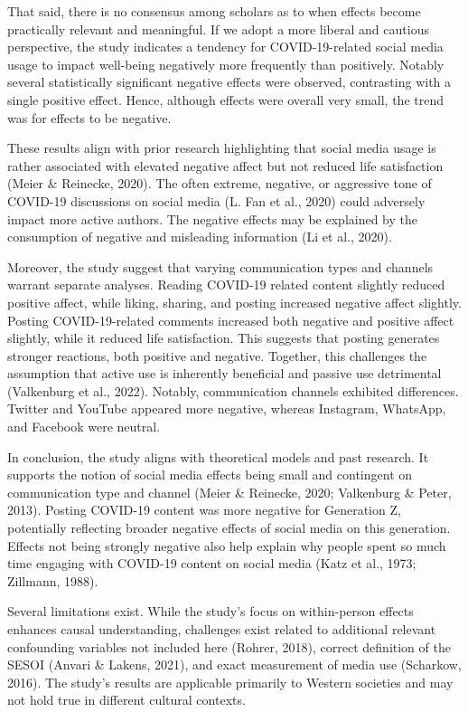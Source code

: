 \documentclass[
  man,mask,floatsintext]{apa7}
\begin{document}
That said, there is no consensus among scholars as to when effects become practically relevant and meaningful. If we adopt a more liberal and cautious perspective, the study indicates a tendency for COVID-19-related social media usage to impact well-being negatively more frequently than positively. Notably several statistically significant negative effects were observed, contrasting with a single positive effect. Hence, although effects were overall very small, the trend was for effects to be negative.

These results align with prior research highlighting that social media usage is rather associated with elevated negative affect but not reduced life satisfaction (Meier \& Reinecke, 2020). The often extreme, negative, or aggressive tone of COVID-19 discussions on social media (L. Fan et al., 2020) could adversely impact more active authors. The negative effects may be explained by the consumption of negative and misleading information (Li et al., 2020).

Moreover, the study suggest that varying communication types and channels warrant separate analyses. Reading COVID-19 related content slightly reduced positive affect, while liking, sharing, and posting increased negative affect slightly. Posting COVID-19-related comments increased both negative and positive affect slightly, while it reduced life satisfaction. This suggests that posting generates stronger reactions, both positive and negative. Together, this challenges the assumption that active use is inherently beneficial and passive use detrimental (Valkenburg et al., 2022). Notably, communication channels exhibited differences. Twitter and YouTube appeared more negative, whereas Instagram, WhatsApp, and Facebook were neutral.

In conclusion, the study aligns with theoretical models and past research. It supports the notion of social media effects being small and contingent on communication type and channel (Meier \& Reinecke, 2020; Valkenburg \& Peter, 2013). Posting COVID-19 content was more negative for Generation Z, potentially reflecting broader negative effects of social media on this generation. Effects not being strongly negative also help explain why people spent so much time engaging with COVID-19 content on social media (Katz et al., 1973; Zillmann, 1988).

Several limitations exist. While the study's focus on within-person effects enhances causal understanding, challenges exist related to additional relevant confounding variables not included here (Rohrer, 2018), correct definition of the SESOI (Anvari \& Lakens, 2021), and exact measurement of media use (Scharkow, 2016). The study's results are applicable primarily to Western societies and may not hold true in different cultural contexts.
\end{document}
